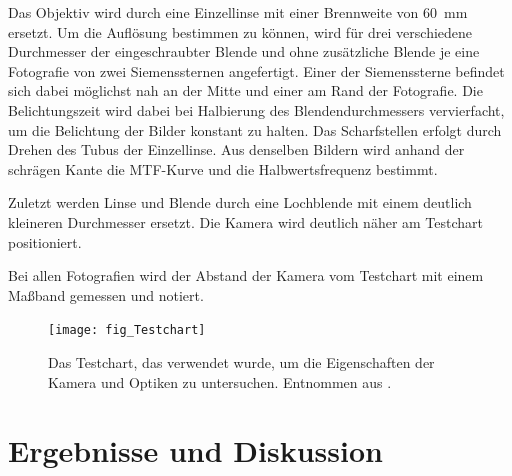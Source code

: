 \documentclass[
	a4paper,
	12pt,
	pagesize,
	ngerman
]{scrartcl}
\begin{document}
	Das Objektiv wird durch eine Einzellinse mit einer Brennweite von \SI{60}{\milli \meter} ersetzt.
	Um die 	Auflösung bestimmen zu können, wird für drei verschiedene Durchmesser der eingeschraubter Blende und ohne zusätzliche Blende je eine Fotografie von zwei Siemenssternen angefertigt.
	Einer der Siemenssterne befindet sich dabei möglichst nah an der Mitte und einer am Rand der Fotografie.
	Die Belichtungszeit wird dabei bei Halbierung des Blendendurchmessers vervierfacht, um die Belichtung der Bilder konstant zu halten. %
	Das Scharfstellen erfolgt durch Drehen des Tubus der Einzellinse.
	Aus denselben Bildern wird anhand der schrägen Kante die MTF-Kurve und die Halbwertsfrequenz bestimmt.
	
	Zuletzt werden Linse und Blende durch eine Lochblende mit einem deutlich kleineren Durchmesser ersetzt. %
	Die Kamera wird deutlich näher am Testchart positioniert.
	
	Bei allen Fotografien wird der Abstand der Kamera vom Testchart mit einem Maßband gemessen und notiert.
	\begin{figure}[H] 
		\texttt{[image: fig\_Testchart]}
		\centering
		\caption{Das Testchart, das verwendet wurde, um die Eigenschaften der Kamera und Optiken zu untersuchen. Entnommen aus \cite{Testchart}.} %
		\label{fig_testchart}
		\centering
	\end{figure}
	
	\section{Ergebnisse und Diskussion}
	
\end{document}
